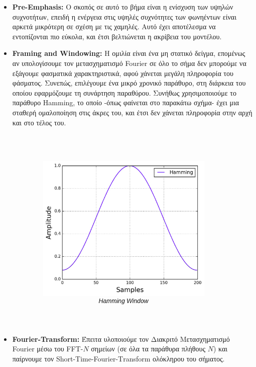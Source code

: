 \documentclass[a4paper, 12pt]{article}
\begin{document}
        \begin{itemize}
            \item \textbf{Pre-Emphasis:} Ο σκοπός σε αυτό το βήμα είναι η ενίσχυση των υψηλών συχνοτήτων, επειδή η ενέργεια στις υψηλές συχνότητες των φωνηέντων είναι αρκετά μικρότερη σε σχέση με τις χαμηλές. Αυτό έχει αποτέλεσμα να εντοπίζονται πιο εύκολα, και έτσι βελτιώνεται η ακρίβεια του μοντέλου.
    
            \item \textbf{Framing and Windowing:} Η ομιλία είναι ένα μη στατικό δείγμα, επομένως αν υπολογίσουμε τον μετασχηματισμό Fourier σε όλο το σήμα δεν μπορούμε να εξάγουμε φασματικά χαρακτηριστικά, αφού χάνεται μεγάλη πληροφορία του φάσματος. Συνεπώς, επιλέγουμε ένα μικρό χρονικό παράθυρο, στη διάρκεια του οποίου εφαρμόζουμε τη συνάρτηση παραθύρου. Συνήθως χρησιμοποιούμε το παράθυρο Hamming, το οποίο -όπως φαίνεται στο παρακάτω σχήμα- έχει μια σταθερή ομαλοποίηση στις άκρες του, και έτσι δεν χάνεται  πληροφορία στην αρχή και στο τέλος του. 
            
            \begin{figure}[H]
                \begin{center}
                    \includegraphics[height=10cm]{hamming.png}
                \end{center}
            \end{figure}

            \item \textbf{Fourier-Transform:} Έπειτα υλοποιούμε τον Διακριτό Μετασχηματισμό Fourier μέσω του FFT-$N$ σημείων (σε όλα τα παράθυρα πλήθους $N$) και παίρνουμε τον Short-Time-Fourier-Τransform ολόκληρου του σήματος. 
    

\end{itemize}
\end{document}
